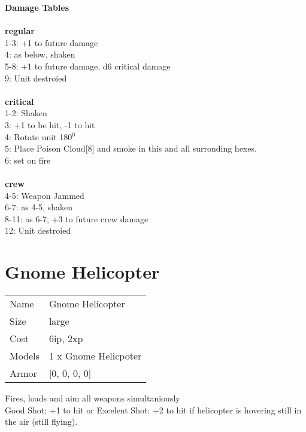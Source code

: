 {\bf Damage Tables} \\
\ \\ {\bf regular } \\
1-3: +1 to future damage \\
4: as below, shaken \\
5-8: +1 to future damage, d6 critical damage \\
9: Unit destroied \\
\ \\ {\bf critical } \\
1-2: Shaken \\
3: +1 to be hit, -1 to hit \\
4: Rotate unit 180$^0$ \\
5: Place Poison Cloud[8] and smoke in this and all surronding hexes. \\
6: set on fire \\
\ \\ {\bf crew } \\
4-5: Weapon Jammed \\
6-7: as 4-5, shaken \\
8-11: as 6-7, +3 to future crew damage \\
12: Unit destroied \\










\pagebreak\pagebreak

\section{ Gnome Helicopter }

\begin{tabular}{ll}
  Name & Gnome Helicopter \\
  Size & large\\
  Cost & 6ip, 2xp\\
  Models & 1 x Gnome Helicpoter\\
  Armor & [0, 0, 0, 0]\\
\end{tabular}

\noindent Fires, loads and aim all weapons simultaniously\\ 
Good Shot: +1 to hit or Excelent Shot: +2 to hit if helicopter is hovering still in the air (still flying).\\ 


